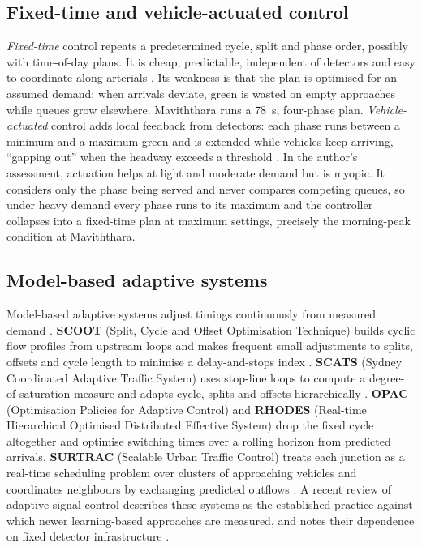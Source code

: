 \subsection{Fixed-time and vehicle-actuated control}
\emph{Fixed-time} control repeats a predetermined cycle, split and phase order, possibly with time-of-day plans.
It is cheap, predictable, independent of detectors and easy to coordinate along arterials
\cite{koonce2008timing}. Its weakness is that the plan is optimised for an assumed demand: when arrivals
deviate, green is wasted on empty approaches while queues grow elsewhere. Maviththara runs a 78~s, four-phase plan. \emph{Vehicle-actuated} control adds local feedback from detectors:
each phase runs between a minimum and a maximum green and is extended while vehicles keep arriving, ``gapping
out'' when the headway exceeds a threshold \cite{koonce2008timing,sumo_actuated}. In the author's assessment,
actuation helps at light and moderate demand but is myopic. It considers only the phase
being served and never compares competing queues, so under heavy demand every phase runs to its maximum and the
controller collapses into a fixed-time plan at maximum settings, precisely the morning-peak condition at
Maviththara.

\subsection{Model-based adaptive systems}
Model-based adaptive systems adjust timings continuously from measured demand
\cite{papageorgiou2003review,stevanovic2010nchrp}. \textbf{SCOOT} (Split, Cycle and Offset Optimisation
Technique) builds cyclic flow profiles from upstream loops and makes frequent small adjustments to splits,
offsets and cycle length to minimise a delay-and-stops index \cite{hunt1981scoot}. \textbf{SCATS} (Sydney
Coordinated Adaptive Traffic System) uses stop-line loops to compute a degree-of-saturation measure and adapts
cycle, splits and offsets hierarchically \cite{sims1980scats}. \textbf{OPAC} (Optimisation Policies for Adaptive
Control) \cite{gartner1983opac} and \textbf{RHODES} (Real-time Hierarchical Optimised Distributed Effective
System) \cite{mirchandani2001rhodes} drop the fixed cycle altogether and optimise switching times over a rolling
horizon from predicted arrivals. \textbf{SURTRAC} (Scalable Urban Traffic Control) treats each junction as a
real-time scheduling problem over clusters of approaching vehicles and coordinates neighbours by exchanging
predicted outflows \cite{xie2012surtrac}. A recent review of adaptive signal control describes these systems as the established practice against which
newer learning-based approaches are measured, and notes their dependence on fixed detector infrastructure
\cite{miletic2022review}.

